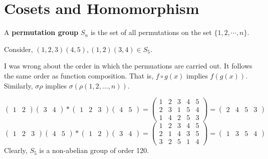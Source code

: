 \section{Cosets and Homomorphism}

\begin{definition}
	A \textbf{permutation group} $S_n$ is the set of all permutations on the set $\{1,2,\cdots,n\}$.	
\end{definition}

\begin{remark}
	Consider, $(1,2,3)(4,5), (1,2)(3,4) \in S_5$.
	\begin{commentary}
		I was wrong about the order in which the permuations are carried out. It follows the same order as function composition. That is, $f \circ g(x)$ implies $f(g(x))$. Similarly, $\sigma\rho$ implies $\sigma(\rho(1,2,\dots,n))$.
	\end{commentary}
	\[\begin{pmatrix} 1 & 2 \end{pmatrix} \begin{pmatrix} 3 & 4 \end{pmatrix} \ast \begin{pmatrix} 1 & 2 & 3 \end{pmatrix} \begin{pmatrix} 4 & 5 \end{pmatrix} =  \begin{pmatrix} 1 & 2 & 3 & 4 & 5 \\ 2 & 3 & 1 & 5 & 4 \\ 1 & 4 & 2 & 5 & 3 \end{pmatrix}  = \begin{pmatrix} 2 & 4 & 5 & 3 \end{pmatrix} \]
		\[\begin{pmatrix} 1 & 2 & 3 \end{pmatrix} \begin{pmatrix} 4 & 5 \end{pmatrix} \ast \begin{pmatrix} 1 & 2 \end{pmatrix} \begin{pmatrix} 3 & 4 \end{pmatrix} =  \begin{pmatrix} 1 & 2 & 3 & 4 & 5 \\ 2 & 1 & 4 & 3 & 5 \\ 3 & 2 & 5 & 1 & 4 \end{pmatrix}  = \begin{pmatrix} 1 & 3 & 5 & 4 \end{pmatrix} \]
	Clearly, $S_5$ is a non-abelian group of order 120.
\end{remark}

